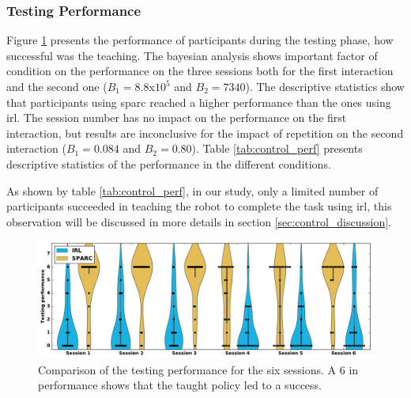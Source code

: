 \subsubsection{Testing Performance}

Figure \ref{fig:control_perf} presents the performance of participants during the testing phase, how successful was the teaching. The bayesian analysis shows important factor of condition on the performance on the three sessions both for the first interaction and the second one ($B_1=8.8$x$10^5$ and $B_2 = 7340$). The descriptive statistics show that participants using \gls{sparc} reached a higher performance than the ones using \gls{irl}. The session number has no impact on the performance on the first interaction, but results are inconclusive for the impact of repetition on the second interaction ($B_1=0.084$ and $B_2=0.80$). Table \ref{tab:control_perf} presents descriptive statistics of the performance in the different conditions.


As shown by table \ref{tab:control_perf}, in our study, only a limited number of participants succeeded in teaching the robot to complete the task using \gls{irl}, this observation will be discussed in more details in section \ref{sec:control_discussion}.


\begin{figure}[ht]
	\includegraphics[width=\textwidth]{performance.pdf}
	\centering
	\caption{Comparison of the testing performance for the six sessions. A 6 in performance shows that the taught policy led to a success.
	}
	\label{fig:control_perf}
\end{figure}

